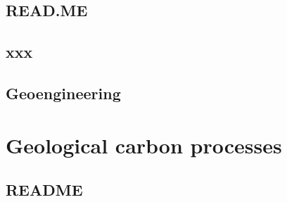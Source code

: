 \documentclass[11pt,fleqn]{book} %
\begin{document}
\hfill \break

\vspace{24mm}

\noindent


\newpage


\section*{READ.ME}



\newpage


\section{xxx}



\newpage


\section{Geoengineering}


\cleardoublepage


\chapter{Geological carbon processes}\label{ch:geological-carbon}

\hfill \break


\newpage


\section*{README}
\end{document}
